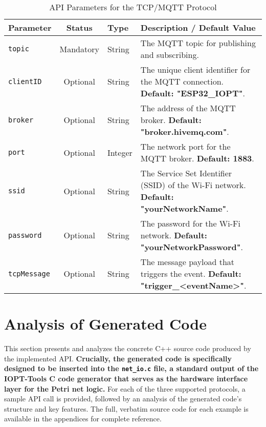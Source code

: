 \begin{table}[h!]
    \centering
    \caption{API Parameters for the TCP/MQTT Protocol}
    \label{tab:tcp_params}
    \begin{tabular}{|l|c|l|p{6cm}|}
        \hline
        \textbf{Parameter} & \textbf{Status} & \textbf{Type} & \textbf{Description / Default Value} \\ \hline
        \texttt{topic} & Mandatory & String & The MQTT topic for publishing and subscribing. \\ \hline
        \texttt{clientID} & Optional & String & The unique client identifier for the MQTT connection. \textbf{Default: "ESP32\_IOPT"}. \\ \hline
        \texttt{broker} & Optional & String & The address of the MQTT broker. \textbf{Default: "broker.hivemq.com"}. \\ \hline
        \texttt{port} & Optional & Integer & The network port for the MQTT broker. \textbf{Default: 1883}. \\ \hline
        \texttt{ssid} & Optional & String & The Service Set Identifier (SSID) of the Wi-Fi network. \textbf{Default: "yourNetworkName"}. \\ \hline
        \texttt{password} & Optional & String & The password for the Wi-Fi network. \textbf{Default: "yourNetworkPassword"}. \\ \hline
        \texttt{tcpMessage} & Optional & String & The message payload that triggers the event. \textbf{Default: "trigger\_<eventName>"}. \\ \hline
    \end{tabular}
\end{table}



\section{Analysis of Generated Code}
\label{sec:code_analysis}

This section presents and analyzes the concrete C++ source code produced by the implemented API. \textbf{Crucially, the generated code is specifically designed to be inserted into the \texttt{net\_io.c} file, a standard output of the IOPT-Tools C code generator that serves as the hardware interface layer for the Petri net logic.} For each of the three supported protocols, a sample API call is provided, followed by an analysis of the generated code's structure and key features. The full, verbatim source code for each example is available in the appendices for complete reference.


